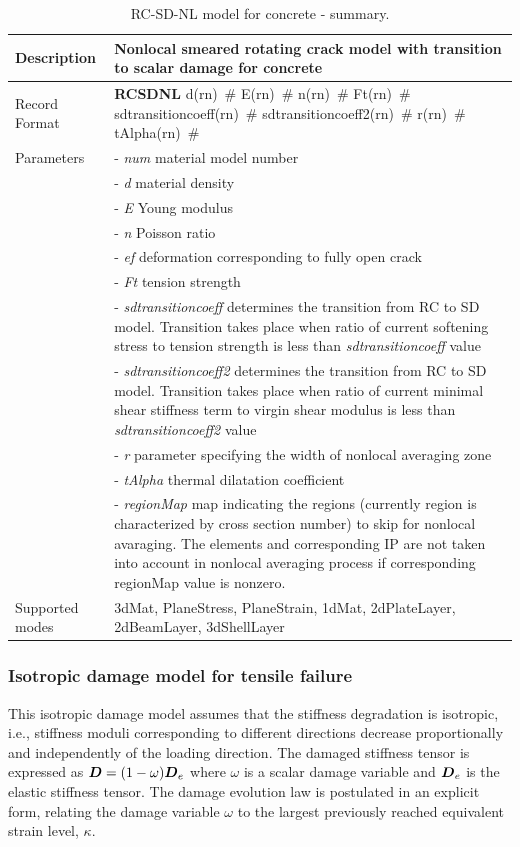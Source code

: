 \documentclass[a4paper]{article}
\newcommand{\mbf}[1]{\mbox{\boldmath$#1$}}
\newcommand{\descitem}[1]{{\noindent \bf #1}}
\newcommand{\elemparam}[2]{{{#1\tiny (#2)}~\#}}
\newcommand{\param}[1]{{\it #1}}
\begin{document}
\begin{table}[!htb]
\begin{tabular}{|l|p{9cm}|}
\hline
Description & Nonlocal smeared rotating crack model with transition to scalar damage for concrete\\
\hline
Record Format & \descitem{RCSDNL} \elemparam{d}{rn} \elemparam{E}{rn}
\elemparam{n}{rn}  \elemparam{Ft}{rn}
\elemparam{sdtransitioncoeff}{rn} \elemparam{sdtransitioncoeff2}{rn}
\elemparam{r}{rn} \elemparam{tAlpha}{rn} \\
Parameters &- \param{num} material model number\\
&- \param{d} material density\\
&- \param{E} Young modulus\\
&- \param{n} Poisson ratio\\
&- \param{ef} deformation corresponding to fully open crack\\
&- \param{Ft} tension strength\\
&- \param{sdtransitioncoeff} determines the transition from RC to SD
model. Transition takes place when ratio of current softening
stress to tension strength is less than  \param{sdtransitioncoeff} value\\
&- \param{sdtransitioncoeff2} determines the transition from RC to SD
model. Transition takes place when ratio of current minimal shear
stiffness term to virgin shear modulus is less than  \param{sdtransitioncoeff2} value\\
&- \param{r} parameter specifying the width of nonlocal averaging zone\\
&- \param{tAlpha} thermal dilatation coefficient\\
&- \param{regionMap} map indicating the regions (currently region is
characterized by cross section number) to skip for nonlocal
avaraging. The elements and corresponding IP are not taken into
account in nonlocal averaging process if corresponding regionMap
value is nonzero.\\
Supported modes& 3dMat, PlaneStress, PlaneStrain, 1dMat,
2dPlateLayer, 2dBeamLayer, 3dShellLayer\\
\hline
\end{tabular}
\caption{RC-SD-NL model for  concrete - summary.}
\label{rcsdnl_table}
\end{table}



\subsubsection{Isotropic damage model for tensile failure}
\label{sec:idmtf}
This isotropic damage model assumes that the stiffness degradation is
isotropic, i.e., stiffness moduli corresponding to different
directions decrease proportionally and independently of the loading 
direction. The damaged stiffness tensor is expressed as
$\mbf{D}=(1-\omega)\mbf{D}_e$ where $\omega$ is a scalar damage variable
and $\mbf{D}_e$ is the elastic stiffness tensor.
The damage evolution law is postulated in an explicit form, relating
the damage variable $\omega$ to the largest previously reached 
equivalent strain level, $\kappa$.
\end{document}
